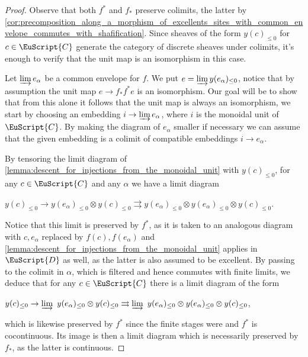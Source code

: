 \documentclass[oneside,a4paper]{amsart}
\newcommand{\euscr}[1]{\EuScript{#1}} %
\newcommand{\ccat}{\euscr{C}} %
\newcommand{\dcat}{\euscr{D}} %
\theoremstyle{plain}
\theoremstyle{definition}
\theoremstyle{remark}
\begin{document}
\begin{proof}
Observe that both $f^{*}$ and $f_{*}$ preserve colimits, the latter by \cref{cor:precomposition_along_a_morphism_of_excellents_sites_with_common_envelope_commutes_with_shafification}. Since sheaves of the form $y(c)_{\leq 0}$ for $c \in \ccat$ generate the category of discrete sheaves under colimits, it's enough to verify that the unit map is an isomorphism in this case.

Let $\varinjlim e_{\alpha}$ be a common envelope for $f$. We put $e = \varinjlim y(e_{\alpha})_{\leq 0}$, notice that by assumption the unit map $e \rightarrow f_{*} f^{*} e$ is an isomorphism. Our goal will be to show that from this alone it follows that the unit map is always an isomorphism, we start by choosing an embedding $i \rightarrow \varinjlim e_{\alpha}$, where $i$ is the monoidal unit of $\ccat$. By making the diagram of $e_{\alpha}$ smaller if necessary we can assume that the given embedding is a colimit of compatible embeddings $i \rightarrow e_{\alpha}$. 

By tensoring the limit diagram of \cref{lemma:descent_for_injections_from_the_monoidal_unit} with $y(c)_{\leq 0}$, for any $c \in \ccat$ and any $\alpha$ we have a limit diagram 

\begin{center}
$y(c)_{\leq 0} \rightarrow y(e_{\alpha}) _{\leq 0} \otimes y(c)_{\leq 0} \rightrightarrows y(e_{\alpha}) _{\leq 0} \otimes y(e_{\alpha}) _{\leq 0} \otimes y(c)_{\leq 0} $.
\end{center}
Notice that this limit is preserved by $f^{*}$, as it is taken to an analogous diagram with $c, e_{\alpha}$ replaced by $f(c), f(e_{\alpha})$ and \cref{lemma:descent_for_injections_from_the_monoidal_unit} applies in $\dcat$ as well, as the latter is also assumed to be excellent. By passing to the colimit in $\alpha$, which is filtered and hence commutes with finite limits, we deduce that for any $c \in \ccat$ there is a limit diagram of the form 

\begin{center}
$y(c)_{\leq 0} \rightarrow \varinjlim \ y(e_{\alpha}) _{\leq 0} \otimes y(c)_{\leq 0} \rightrightarrows \varinjlim \ y(e_{\alpha}) _{\leq 0} \otimes y(e_{\alpha}) _{\leq 0} \otimes y(c)_{\leq 0}$,
\end{center}
which is likewise preserved by $f^{*}$ since the finite stages were and $f^{*}$ is cocontinuous. Its image is then a limit diagram which is necessarily preserved by $f_{*}$, as the latter is continuous. 


\end{proof}
\end{document}
